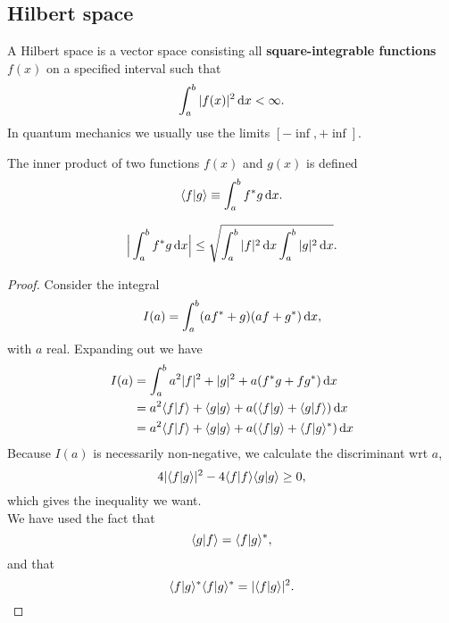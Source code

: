 \subsection{Hilbert space}
\begin{defi}
A Hilbert space is a vector space consisting all \textbf{square-integrable functions} $f(x)$ on a specified interval such that
\begin{equation}
\int^b_a|f(x)|^2\dx<\inf.
\end{equation}
In quantum mechanics we usually use the limits $[-\inf,+\inf]$.
\end{defi}
\begin{defi}
The inner product of two functions $f(x)$ and $g(x)$ is defined
\begin{equation}
\lgl f|g\rgl\equiv\int^b_af^*g\dx.
\end{equation}
\end{defi}
\begin{thrm}
\begin{equation}
\Big|\int^b_af^*g\dx\Big|\leq\sqrt{\int^b_a|f|^2\dx\int^b_a|g|^2\dx}.
\end{equation}
\end{thrm}
\begin{proof}
Consider the integral
\begin{equation}
I(a)=\int^b_a(af^*+g)(af+g^*)\dx,
\end{equation}
with $a$ real. Expanding out we have
\begin{subequations}
\begin{align}
I(a)&=\int^b_a a^2|f|^2+|g|^2+a(f^*g+fg^*)\dx\\
&=a^2 \lgl f|f\rgl+\lgl g|g\rgl+a(\lgl f|g\rgl+\lgl g|f\rgl)\dx\\
&=a^2 \lgl f|f\rgl+\lgl g|g\rgl+a(\lgl f|g\rgl+\lgl f|g\rgl^*)\dx
\end{align}
\end{subequations}
Because $I(a)$ is necessarily non-negative, we calculate the discriminant wrt $a$, 
\begin{equation}
4|\langle f|g\rangle|^2-4 \langle f|f\rangle \langle g|g\rangle\geq0,
\end{equation}
which gives the inequality we want. \\
We have used the fact that 
\begin{equation}
\langle g|f\rangle=\langle f|g\rangle^*, 
\end{equation}
and that
\begin{equation}
\langle f|g\rangle^*\langle f|g\rangle^*=|\langle f|g\rangle|^2.
\end{equation}
\end{proof}
